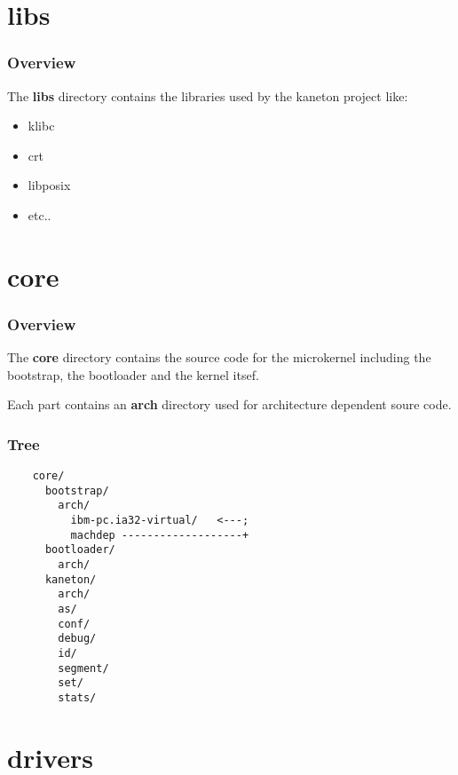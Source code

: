 %
%

\section{libs}


\begin{frame}
  \frametitle{Overview}

  The \textbf{libs} directory contains the libraries used by the kaneton
  project like:

  \begin{itemize}
    \item
      klibc
    \item
      crt
    \item
      libposix
    \item
      etc..
  \end{itemize}
\end{frame}

%
%

\section{core}


\begin{frame}
  \frametitle{Overview}

  The \textbf{core} directory contains the source code for the microkernel
  including the bootstrap, the bootloader and the kernel itsef.

  \nl

  Each part contains an \textbf{arch} directory used for architecture
  dependent soure code.
\end{frame}


\begin{frame}[containsverbatim]
  \frametitle{Tree}

  \begin{verbatim}
    core/
      bootstrap/
        arch/
          ibm-pc.ia32-virtual/   <---;
          machdep -------------------+
      bootloader/
        arch/
      kaneton/
        arch/
        as/
        conf/
        debug/
        id/
        segment/
        set/
        stats/
  \end{verbatim}
\end{frame}

%
%

\section{drivers}

